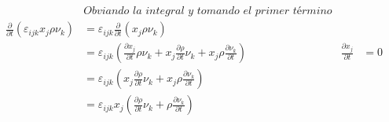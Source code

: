 \documentclass[a4paper,10pt,twoside,final,spanish]{article}
\begin{document}
\begin{align*}
& \textit{Obviando la integral y tomando el primer término} \\
\frac{\partial}{\partial t}(\varepsilon_{ijk}x_{j}\rho\nu_{k})
&= \varepsilon_{ijk}\frac{\partial}{\partial t}(x_{j}\rho\nu_{k}) \\
&= \varepsilon_{ijk}\left(\frac{\partial x_{j}}{\partial t}\rho\nu_{k}
+x_{j}\frac{\partial\rho}{\partial t}\nu_{k}
+x_{j}\rho\frac{\partial\nu_{k}}{\partial t}\right)
& \frac{\partial x_{j}}{\partial t} &= 0 \\
&= \varepsilon_{ijk}\left(x_{j}\frac{\partial\rho}{\partial t}\nu_{k}
+x_{j}\rho\frac{\partial\nu_{k}}{\partial t}\right) \\
&= \varepsilon_{ijk}x_{j}\left(\frac{\partial\rho}{\partial t}\nu_{k}
+\rho\frac{\partial\nu_{k}}{\partial t}\right)
\end{align*}
\end{document}
